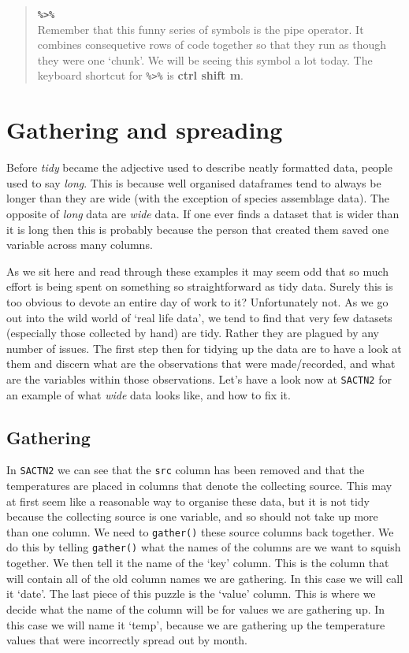 \documentclass[]{book}
\theoremstyle{definition}
\theoremstyle{definition}
\theoremstyle{definition}
\theoremstyle{remark}
\begin{document}
\begin{quote}
\textbf{\texttt{\%\textgreater{}\%}}\\
Remember that this funny series of symbols is the pipe operator. It
combines consequetive rows of code together so that they run as though
they were one `chunk'. We will be seeing this symbol a lot today. The
keyboard shortcut for \texttt{\%\textgreater{}\%} is \textbf{ctrl shift
m}.
\end{quote}

\section{Gathering and spreading}\label{gathering-and-spreading}

Before \emph{tidy} became the adjective used to describe neatly
formatted data, people used to say \emph{long}. This is because well
organised dataframes tend to always be longer than they are wide (with
the exception of species assemblage data). The opposite of \emph{long}
data are \emph{wide} data. If one ever finds a dataset that is wider
than it is long then this is probably because the person that created
them saved one variable across many columns.

As we sit here and read through these examples it may seem odd that so
much effort is being spent on something so straightforward as tidy data.
Surely this is too obvious to devote an entire day of work to it?
Unfortunately not. As we go out into the wild world of `real life data',
we tend to find that very few datasets (especially those collected by
hand) are tidy. Rather they are plagued by any number of issues. The
first step then for tidying up the data are to have a look at them and
discern what are the observations that were made/recorded, and what are
the variables within those observations. Let's have a look now at
\texttt{SACTN2} for an example of what \emph{wide} data looks like, and
how to fix it.

\subsection{Gathering}\label{gathering}

In \texttt{SACTN2} we can see that the \texttt{src} column has been
removed and that the temperatures are placed in columns that denote the
collecting source. This may at first seem like a reasonable way to
organise these data, but it is not tidy because the collecting source is
one variable, and so should not take up more than one column. We need to
\texttt{gather()} these source columns back together. We do this by
telling \texttt{gather()} what the names of the columns are we want to
squish together. We then tell it the name of the `key' column. This is
the column that will contain all of the old column names we are
gathering. In this case we will call it `date'. The last piece of this
puzzle is the `value' column. This is where we decide what the name of
the column will be for values we are gathering up. In this case we will
name it `temp', because we are gathering up the temperature values that
were incorrectly spread out by month.
\end{document}
